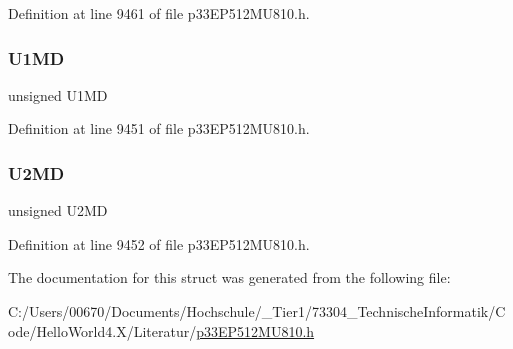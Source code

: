 Definition at line 9461 of file p33\+E\+P512\+M\+U810.\+h.

\mbox{\label{structtag_p_m_d1_b_i_t_s_ac5c2e6756f360fa7d9a3995843ffd5d1}} 
\subsubsection{\texorpdfstring{U1\+MD}{U1MD}}
{\footnotesize\ttfamily unsigned U1\+MD}



Definition at line 9451 of file p33\+E\+P512\+M\+U810.\+h.

\mbox{\label{structtag_p_m_d1_b_i_t_s_afae6e78ad34918b7759cfe1a1c76581a}} 
\subsubsection{\texorpdfstring{U2\+MD}{U2MD}}
{\footnotesize\ttfamily unsigned U2\+MD}



Definition at line 9452 of file p33\+E\+P512\+M\+U810.\+h.



The documentation for this struct was generated from the following file\+:\begin{DoxyCompactItemize}
\item 
C\+:/\+Users/00670/\+Documents/\+Hochschule/\+\_\+\+Tier1/73304\+\_\+\+Technische\+Informatik/\+Code/\+Hello\+World4.\+X/\+Literatur/\hyperlink{p33_e_p512_m_u810_8h}{p33\+E\+P512\+M\+U810.\+h}\end{DoxyCompactItemize}
